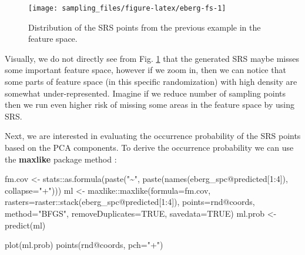\documentclass[
  graybox,natbib,nospthms]{svmono}
\newenvironment{Shaded}{\begin{snugshade}}{\end{snugshade}}
\newcommand{\AttributeTok}[1]{\textcolor[rgb]{0.61,0.61,0.61}{#1}}
\newcommand{\ConstantTok}[1]{\textcolor[rgb]{0,0,0}{#1}}
\newcommand{\DecValTok}[1]{\textcolor[rgb]{0.06,0.06,0.06}{#1}}
\newcommand{\FunctionTok}[1]{\textcolor[rgb]{0,0,0}{#1}}
\newcommand{\NormalTok}[1]{#1}
\newcommand{\OtherTok}[1]{\textcolor[rgb]{0.37,0.37,0.37}{#1}}
\newcommand{\SpecialCharTok}[1]{\textcolor[rgb]{0,0,0}{#1}}
\newcommand{\StringTok}[1]{\textcolor[rgb]{0.5,0.5,0.5}{#1}}
\begin{document}
\begin{figure}

{\centering \texttt{[image: sampling\_files/figure-latex/eberg-fs-1]} 

}

\caption{Distribution of the SRS points from the previous example in the feature space.}\label{fig:eberg-fs}
\end{figure}

Visually, we do not directly see from Fig. \ref{fig:eberg-fs} that the generated SRS
maybe misses some important feature space, however if we zoom in, then we can notice that some
parts of feature space (in this specific randomization) with high density are somewhat
under-represented. Imagine if we reduce number of sampling points then we run
even higher risk of missing some areas in the feature space by using SRS.

Next, we are interested in evaluating the occurrence probability of the SRS points
based on the PCA components. To derive the occurrence probability we can use
the \textbf{maxlike} package method \citep{Royle2012}:

\begin{Shaded}
\begin{Highlighting}[]
\NormalTok{fm.cov }\OtherTok{\textless{}{-}}\NormalTok{ stats}\SpecialCharTok{::}\FunctionTok{as.formula}\NormalTok{(}\FunctionTok{paste}\NormalTok{(}\StringTok{"\textasciitilde{}"}\NormalTok{, }\FunctionTok{paste}\NormalTok{(}\FunctionTok{names}\NormalTok{(eberg\_spc}\SpecialCharTok{@}\NormalTok{predicted[}\DecValTok{1}\SpecialCharTok{:}\DecValTok{4}\NormalTok{]), }\AttributeTok{collapse=}\StringTok{"+"}\NormalTok{)))}
\NormalTok{ml }\OtherTok{\textless{}{-}}\NormalTok{ maxlike}\SpecialCharTok{::}\FunctionTok{maxlike}\NormalTok{(}\AttributeTok{formula=}\NormalTok{fm.cov, }\AttributeTok{rasters=}\NormalTok{raster}\SpecialCharTok{::}\FunctionTok{stack}\NormalTok{(eberg\_spc}\SpecialCharTok{@}\NormalTok{predicted[}\DecValTok{1}\SpecialCharTok{:}\DecValTok{4}\NormalTok{]), }
                       \AttributeTok{points=}\NormalTok{rnd}\SpecialCharTok{@}\NormalTok{coords, }\AttributeTok{method=}\StringTok{"BFGS"}\NormalTok{, }\AttributeTok{removeDuplicates=}\ConstantTok{TRUE}\NormalTok{, }\AttributeTok{savedata=}\ConstantTok{TRUE}\NormalTok{)}
\NormalTok{ml.prob }\OtherTok{\textless{}{-}} \FunctionTok{predict}\NormalTok{(ml)}
\end{Highlighting}
\end{Shaded}

\begin{Shaded}
\begin{Highlighting}[]
\FunctionTok{plot}\NormalTok{(ml.prob)}
\FunctionTok{points}\NormalTok{(rnd}\SpecialCharTok{@}\NormalTok{coords, }\AttributeTok{pch=}\StringTok{"+"}\NormalTok{)}
\end{Highlighting}
\end{Shaded}
\end{document}
